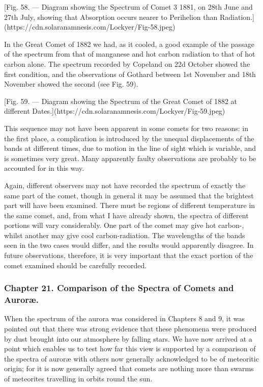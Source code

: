 \documentclass[a4paper, 12pt, oneside, polutonikogreek, english]{article}
\begin{document}
[Fig. 58. --- Diagram showing the Spectrum of Comet 3 1881, on 28th June and 27th July, showing that Absorption occurs nearer to Perihelion than Radiation.](https://cdn.solaranamnesis.com/Lockyer/Fig-58.jpeg)

In the Great Comet of 1882 we had, as it cooled, a good example of the passage of the spectrum from that of manganese and hot carbon radiation to that of hot carbon alone. The spectrum recorded by Copeland on 22d October showed the first condition, and the observations of Gothard between 1st November and 18th November showed the second (see Fig. 59).

[Fig. 59. --- Diagram showing the Spectrum of the Great Comet of 1882 at different Dates.](https://cdn.solaranamnesis.com/Lockyer/Fig-59.jpeg)

This sequence may not have been apparent in some comets for two reasons: in the first place, a complication is introduced by the unequal displacements of the bands at different times, due to motion in the line of sight which is variable, and is sometimes very great. Many apparently faulty observations are probably to be accounted for in this way.

Again, different observers may not have recorded the spectrum of exactly the same part of the comet, though in general it may be assumed that the brightest part will have been examined. There must be regions of different temperature in the same comet, and, from what I have already shown, the spectra of different portions will vary considerably. One part of the comet may give hot carbon-, whilst another may give cool carbon-radiation. The wavelengths of the bands seen in the two cases would differ, and the results would apparently disagree. In future observations, therefore, it is very important that the exact portion of the comet examined should be carefully recorded.

\subsubsection{Chapter 21. Comparison of the Spectra of Comets and Auroræ.}

When the spectrum of the aurora was considered in Chapters 8 and 9, it was pointed out that there was strong evidence that these phenomena were produced by dust brought into our atmosphere by falling stars. We have now arrived at a point which enables us to test how far this view is supported by a comparison of the spectra of auroræ with others now generally acknowledged to be of meteoritic origin; for it is now generally agreed that comets are nothing more than swarms of meteorites travelling in orbits round the sun.
\end{document}
